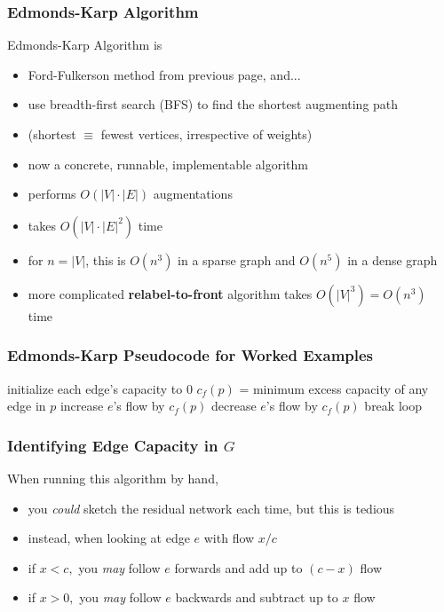 \documentclass{beamer}
\begin{document}
\begin{frame} \frametitle{Edmonds-Karp Algorithm}
Edmonds-Karp Algorithm is
\begin{itemize}
  \item Ford-Fulkerson method from previous page, and...
  \item use breadth-first search (BFS) to find the shortest augmenting path
  \item (shortest $\equiv$ fewest vertices, irrespective of weights)
  \item now a concrete, runnable, implementable algorithm
  \item performs $O(|V| \cdot |E|)$ augmentations
  \item takes $O(|V| \cdot |E|^2)$ time
  \item for $n=|V|$, this is $O(n^3)$ in a sparse graph and $O(n^5)$ in a dense graph
  \item more complicated \textbf{relabel-to-front} algorithm takes $O(|V|^3)=O(n^3)$
    time
\end{itemize}
\end{frame}

\begin{frame} \frametitle{Edmonds-Karp Pseudocode for Worked Examples}
  {\footnotesize
  \begin{algorithmic}[1]
    \State initialize each edge's capacity to 0
    \Repeat
          \State $c_f(p)$ = minimum excess capacity of any edge in $p$
              \State increase $e$'s flow by $c_f(p)$
            \Else
              \State decrease $e$'s flow by $c_f(p)$
            \EndIf
          \EndFor
          \State break loop
        \EndIf
      \EndFor
    \State {}
    \EndFunction
  \end{algorithmic}
  }
\end{frame}

\begin{frame} \frametitle{Identifying Edge Capacity in $G$}
When running this algorithm by hand,
\begin{itemize}
  \item you \emph{could} sketch the residual network each time, but this is tedious
  \item instead, when looking at edge $e$ with flow $x/c$
  \item if $x<c,$ you \emph{may} follow $e$ forwards and add up to $(c-x)$ flow
  \item if $x>0,$ you \emph{may} follow $e$ backwards and subtract up to $x$ flow
\end{itemize}
\end{frame}
\end{document}
